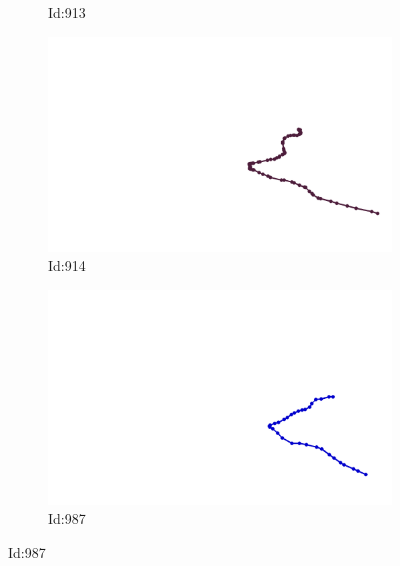 \documentclass[12pt,twoside]{report}
\begin{document}
\begin{figure}
\begin{subfigure}[b]{0.20\textwidth}
\caption{Id:913}
\end{subfigure}
\begin{subfigure}[b]{0.20\textwidth}
\centering
\includegraphics[width=\textwidth]{../trajectories/914.png}
\caption{Id:914}
\end{subfigure}
\begin{subfigure}[b]{0.20\textwidth}
\centering
\includegraphics[width=\textwidth]{../trajectories/987.png}
\caption{Id:987}
\end{subfigure}
\end{figure}
\end{document}

